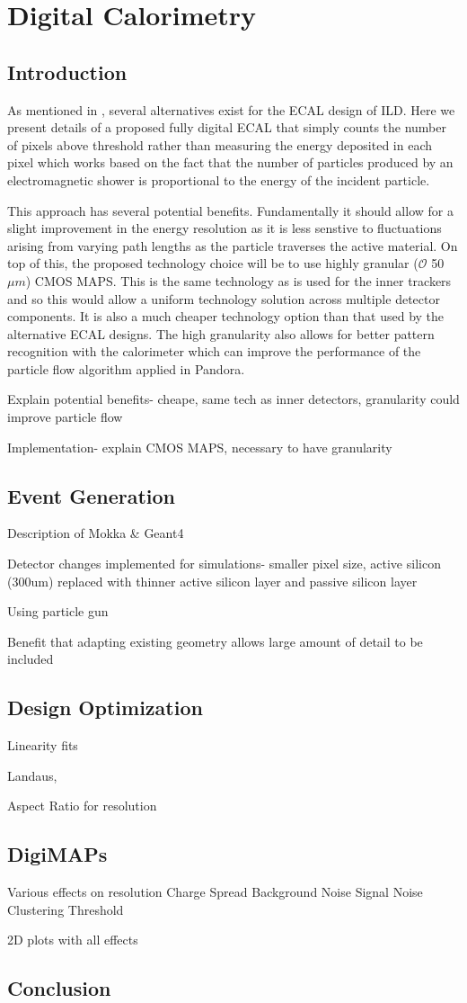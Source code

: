 \chapter{Digital Calorimetry}
\label{sect:DECAL}

\section{Introduction}
As mentioned in , several alternatives exist for the \ac{ECAL} design of \ac{ILD}. Here we present details of a proposed fully digital \ac{ECAL} that simply counts the number of pixels above threshold rather than measuring the energy deposited in each pixel which works based on the fact that the number of particles produced by an electromagnetic shower is proportional to the energy of the incident particle.

This approach has several potential benefits. Fundamentally it should allow for a slight improvement in the energy resolution as it is less senstive to fluctuations arising from varying path lengths as the particle traverses the active material. On top of this, the proposed technology choice will be to use highly granular ($\mathcal{O}$ 50$\mu m$) \ac{CMOS} \ac{MAPS}. This is the same technology as is used for the inner trackers and so this would allow a uniform technology solution across multiple detector components. It is also a much cheaper technology option than that used by the alternative \ac{ECAL} designs. The high granularity also allows for better pattern recognition with the calorimeter which can improve the performance of the particle flow algorithm applied in Pandora.


Explain potential benefits- cheape, same tech as inner detectors, granularity could improve particle flow

Implementation- explain CMOS MAPS, necessary to have granularity

\section{Event Generation}

Description of Mokka \& Geant4

Detector changes implemented for simulations- smaller pixel size, active silicon (300um) replaced with thinner active silicon layer and passive silicon layer

Using particle gun

Benefit that adapting existing geometry allows large amount of detail to be included

\section{Design Optimization}
Linearity fits

Landaus, 

Aspect Ratio for resolution



\section{DigiMAPs}
Various effects on resolution
Charge Spread
Background Noise
Signal Noise
Clustering
Threshold

2D plots with all effects

\section{Conclusion}
